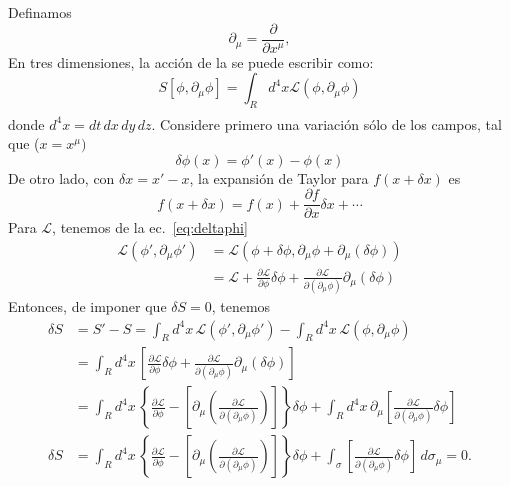 Definamos
\begin{equation}
  \label{eq:dmu}
  \partial_\mu=\frac{\partial}{\partial x^\mu},
  \end{equation}
En tres dimensiones, la acción de la se puede escribir como:
\begin{equation}
  \label{eq:Scall3d}
  S[\phi,\partial_\mu\phi]=\int_{R}d^4x\mathcal{L}(\phi,\partial_\mu\phi)
\end{equation}
\begin{align}

\end{align}donde $d^4x=d t\,d x\, d y\,d z$.  Considere primero una variación sólo de
los campos, tal que ($x=x^\mu)$
\begin{equation}
  \label{eq:deltaphi}
  \delta\phi(x)=\phi'(x)-\phi(x)
\end{equation}
De otro lado, con $\delta x=x'-x$, la expansión de Taylor para $f(x+\delta x)$ es
\begin{equation}
  f(x+\delta x)=f(x)+\frac{\partial f}{\partial x}\delta x+\cdots 
\end{equation}
Para $\mathcal{L}$, tenemos de la ec.~\eqref{eq:deltaphi}
\begin{align}
  \mathcal{L}(\phi',\partial_\mu\phi')&=\mathcal{L}(\phi+\delta\phi,\partial_\mu\phi+\partial_\mu(\delta\phi))\nonumber\\
  &=\mathcal{L}+\frac{\partial\mathcal{L}}{\partial\phi}\delta\phi+\frac{\partial\mathcal{L}}{\partial(\partial_\mu\phi)}\partial_\mu(\delta\phi)
\end{align}
Entonces, de imponer que $\delta S=0$, tenemos
\begin{align}
  \delta S&=S'-S=\int_{R}d^4x\,\mathcal{L}(\phi',\partial_\mu\phi')-\int_{R}d^4x\,\mathcal{L}(\phi,\partial_\mu\phi)\nonumber\\
&=\int_{R}d^4x\,
\left[
\frac{\partial\mathcal{L}}{\partial\phi}\delta\phi+\frac{\partial\mathcal{L}}{\partial(\partial_\mu\phi)}\partial_\mu(\delta\phi)
\right]\nonumber\\
 &=\int_{R}d^4x\,
  \left\{ 
    \frac{\partial\mathcal{L}}{\partial\phi}-\left[\partial_\mu\left(
      \frac{\partial\mathcal{L}}{\partial(\partial_\mu\phi)}
    \right)\right]
  \right\}\delta\phi+\int_{R}d^4x\,
    \partial_\mu\left[
      \frac{\partial\mathcal{L}}{\partial(\partial_\mu\phi)}\delta\phi
    \right]\nonumber\\
\label{eq:1qft}
\delta S&=\int_{R}d^4x\,
  \left\{ 
    \frac{\partial\mathcal{L}}{\partial\phi}-    
    \left[\partial_\mu\left(
      \frac{\partial\mathcal{L}}{\partial(\partial_\mu\phi)}
    \right)\right]
  \right\}\delta\phi+\int_{\sigma}\left[
      \frac{\partial\mathcal{L}}{\partial(\partial_\mu\phi)}\delta\phi
    \right]\,d\sigma_\mu=0.
\end{align}
